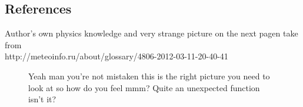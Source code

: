 \documentclass[a4paper,12pt]{article}
\begin{document}
\subsection*{References}
Author's own physics knowledge and very strange picture on the next pagen take from \\
http://meteoinfo.ru/about/glossary/4806-2012-03-11-20-40-41
\newpage
\begin{figure}[h]
	\caption{Yeah man you're not mistaken this is the right picture you need to look at so how do you feel mmm? Quite an unexpected function isn't it?}
	\label{ris:athmosphere_vert_struct}
\end{figure}
\end{document}
